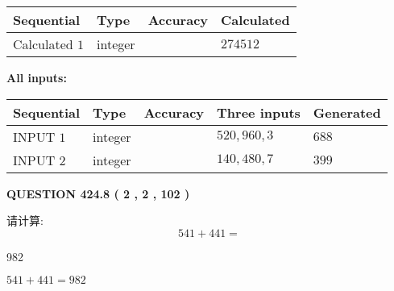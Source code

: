 \documentclass{ctexart}
\begin{document}
   
  
  
\noindent\begin{tabular}{|l|l|l|l|}
\hline
 Sequential & Type & Accuracy & Calculated \\ 
\hline
 
 
  Calculated $  1 $ & integer &  & 
  $ 274512 $ 
 \\  \hline  
 \end{tabular}
   
   
   
   
\noindent\vspace{0.1in}\hspace{-0.08in} {\textbf{\Large{All inputs: }}}
   
   
  
  
\noindent\begin{tabular}{|l|l|l|l|l|}
\hline
 Sequential & Type & Accuracy & Three inputs & Generated \\ 
\hline
 
 
  INPUT $  1 $ & integer &  & $
 520
 , 
 960
 , 
 3
 $ & $ 688 $ 
 \\  \hline  
 
 
  INPUT $  2 $ & integer &  & $
 140
 , 
 480
 , 
 7
 $ & $ 399 $ 
 \\  \hline  
 \end{tabular}
   
   
  
\vspace{0.2in}
  
{\textbf{\Large{QUESTION
424.8 
 ( 2 , 2 , 102 )
}}}
  
  
 
请计算:
\begin{equation}
541 +  %
441 = \nonumber
\end{equation}
 
 
 
\noindent{}
 
 

982
 
 
\noindent{}
 
 

 
 
 
\noindent{}
 
 

$ %
541 +  %
441=   %
982$
 
\end{document}
